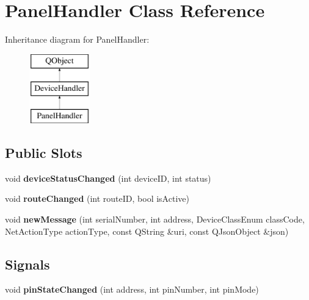 \hypertarget{class_panel_handler}{}\section{Panel\+Handler Class Reference}
\label{class_panel_handler}
Inheritance diagram for Panel\+Handler\+:\begin{figure}[H]
\begin{center}
\leavevmode
\includegraphics[height=3.000000cm]{class_panel_handler}
\end{center}
\end{figure}
\subsection*{Public Slots}
\begin{DoxyCompactItemize}
\item 
\mbox{\label{class_panel_handler_a05157ddbd8078dbbfeb3322d5771a904}} 
void {\bfseries device\+Status\+Changed} (int device\+ID, int status)
\item 
\mbox{\label{class_panel_handler_a1c0aac4488ad7349d878c9da7019d0ee}} 
void {\bfseries route\+Changed} (int route\+ID, bool is\+Active)
\item 
\mbox{\label{class_panel_handler_a630c3319157392b51cf1b8723236d6a4}} 
void {\bfseries new\+Message} (int serial\+Number, int address, Device\+Class\+Enum class\+Code, Net\+Action\+Type action\+Type, const Q\+String \&uri, const Q\+Json\+Object \&json)
\end{DoxyCompactItemize}
\subsection*{Signals}
\begin{DoxyCompactItemize}
\item 
\mbox{\label{class_panel_handler_a18fde358d19fa0b07f8ce084e5556031}} 
void {\bfseries pin\+State\+Changed} (int address, int pin\+Number, int pin\+Mode)
\end{DoxyCompactItemize}
